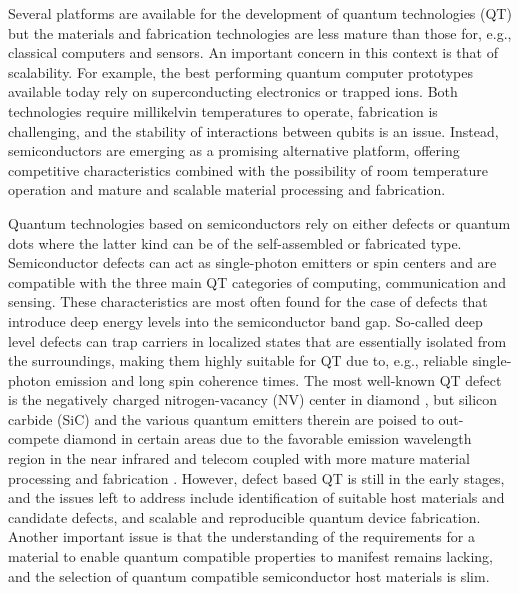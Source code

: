 \documentclass[superscriptaddress,unsortedaddress,
 amsmath,amssymb,
 aps,
]{revtex4-2}
\begin{document}
Several platforms are available for the development of quantum technologies (QT) but the materials and fabrication technologies are less mature than those for, e.g., classical computers and sensors. 
An important concern in this context is that of scalability. 
For example, the best performing quantum computer prototypes available today rely on superconducting electronics or trapped ions. Both technologies require millikelvin temperatures to operate, fabrication is challenging, and the stability of interactions between qubits is an issue. Instead, semiconductors are emerging as a promising alternative platform, offering competitive characteristics combined with the possibility of room temperature operation and mature and scalable material processing and fabrication.  

Quantum technologies based on semiconductors rely on either defects or quantum dots where the latter kind can be of the self-assembled or fabricated type. 
Semiconductor defects can act as single-photon emitters or spin centers and are compatible with the three main QT categories of computing, communication and sensing.  
These characteristics are most often found for the case of defects that introduce deep energy levels into the semiconductor band gap. So-called deep level defects can trap carriers in localized states that are essentially isolated from the surroundings, making them highly suitable for QT due to, e.g., reliable single-photon emission and long spin coherence times. 
The most well-known QT defect is the negatively charged nitrogen-vacancy (NV) center in diamond \cite{Doherty_2013}, but silicon carbide (SiC) and the various quantum emitters therein are poised to out-compete diamond in certain areas due to the favorable emission wavelength region in the near infrared and telecom coupled with more mature material processing and fabrication  \cite{Bathen2021}. 
However, defect based QT is still in the early stages, and the issues left to address include identification of suitable host materials and candidate defects, and scalable and reproducible quantum device fabrication. Another important issue is that the understanding of the requirements for a material to enable quantum compatible properties to manifest remains lacking,  
and the selection of quantum compatible semiconductor host materials is slim. 
\end{document}
